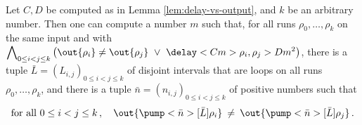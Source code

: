 \documentclass{article}
\begin{document}
\begin{lemma}\label{lem:saarela-delay}\label{cor:saarela-delay}
Let $C,D$ be computed as in Lemma \ref{lem:delay-vs-output},
and $k$ be an arbitrary number. Then one can compute a number $m$
such that, for all runs $\rho_0,\dots,\rho_k$ on the same input and with 
$\displaystyle\bigwedge\nolimits_{0\le i<j\le k} 
 \big(\out{\rho_i} \neq \out{\rho_j} ~\vee~
      \delay<C m>{\rho_i,\rho_j} > D m^2\big)$,
there is a tuple 
$\bar{L} = (L_{i,j})_{0\le i<j\le k}$ of disjoint intervals
that are loops on all runs $\rho_0,\dots,\rho_k$,
and there is a tuple $\bar n = (n_{i,j})_{0\le i<j\le k}$
of positive numbers such that
\[
  \text{for all } 0\le i<j\le k\,, \quad 
  \out{\pump<\bar n>[\bar L]{\rho_i}} 
  \:\neq\:
  \out{\pump<\bar n>[\bar L]{\rho_j}} \, .
\]
\end{lemma} 
\end{document}
